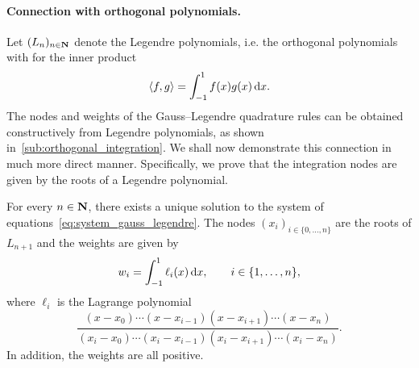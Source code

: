 \paragraph{Connection with orthogonal polynomials.}
Let $(L_n)_{n \in \mathbf N}$ denote the Legendre polynomials,
i.e. the orthogonal polynomials with for the inner product
\[
    \langle f, g\rangle = \int_{-1}^{1} f(x) g(x) \, \mathrm d x.
\]
The nodes and weights of the Gauss--Legendre quadrature rules can be obtained constructively from Legendre polynomials,
as shown in~\cref{sub:orthogonal_integration}.
We shall now demonstrate this connection in much more direct manner.
Specifically, we prove that the integration nodes are given by the roots of a Legendre polynomial.
\begin{theorem}
    \label{theorem:gauss_legendre_connection_polynomials}
    For every $n \in \mathbf N$,
    there exists a unique solution to the system of equations~\eqref{eq:system_gauss_legendre}.
    The nodes $(x_i)_{i \in \{0,\dotsc, n\}}$ are the roots of $L_{n+1}$
    and the weights are given by
    \begin{equation}
        \label{eq:weights_gauss}
        w_i = \int_{-1}^{1} \ell_i(x) \, \mathrm d x, \qquad i \in \{ 1, \dotsc, n\},
    \end{equation}
    where $\ell_i$ is the Lagrange polynomial
    \[
        \frac{(x - x_0) \dotsb (x - x_{i-1})(x- x_{i+1}) \dotsb (x - x_n)}
        {(x_i - x_0) \dotsb (x_i - x_{i-1})(x_i- x_{i+1}) \dotsb (x_i - x_n)}.
    \]
    In addition, the weights are all positive.
\end{theorem}
